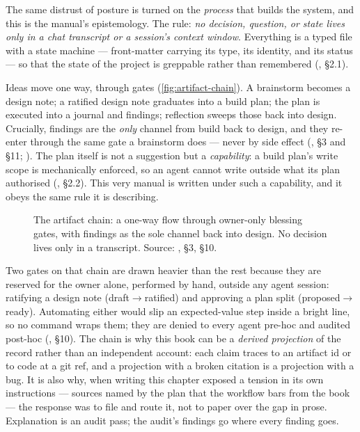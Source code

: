 The same distrust of posture is turned on the \emph{process} that builds the
system, and this is the manual's epistemology. The rule: \emph{no decision,
question, or state lives only in a chat transcript or a session's context window}.
Everything is a typed file with a state machine --- front-matter carrying its type,
its identity, and its status --- so that the state of the project is greppable
rather than remembered (, \S 2.1).

Ideas move one way, through gates (\autoref{fig:artifact-chain}). A brainstorm
becomes a design note; a ratified design note graduates into a build plan; the plan
is executed into a journal and findings; reflection sweeps those back into design.
Crucially, findings are the \emph{only} channel from build back to design, and they
re-enter through the same gate a brainstorm does --- never by side effect
(, \S 3 and \S 11; ). The
plan itself is not a suggestion but a \emph{capability}: a build plan's write scope
is mechanically enforced, so an agent cannot write outside what its plan authorised
(, \S 2.2). This very manual is written under such a
capability, and it obeys the same rule it is describing.

\begin{figure}[t]
  \centering
  
  \caption[The artifact chain]{The artifact chain: a one-way flow through owner-only
    blessing gates, with findings as the sole channel back into design. No decision
    lives only in a transcript. Source: , \S 3, \S 10.}
  \label{fig:artifact-chain}
\end{figure}

Two gates on that chain are drawn heavier than the rest because they are reserved
for the owner alone, performed by hand, outside any agent session: ratifying a
design note (\textsf{draft}$\to$\textsf{ratified}) and approving a plan split
(\textsf{proposed}$\to$\textsf{ready}). Automating either would slip an
expected-value step inside a bright line, so no command wraps them; they are denied
to every agent pre-hoc and audited post-hoc (, \S 10).
The chain is why this book can be a \emph{derived projection} of the record rather
than an independent account: each claim traces to an artifact id or to code at a
git ref, and a projection with a broken citation is a projection with a bug. It is
also why, when writing this chapter exposed a tension in its own instructions ---
sources named by the plan that the workflow bars from the book --- the response was
to file  and route it, not to paper over the gap in prose.
Explanation is an audit pass; the audit's findings go where every finding goes.

